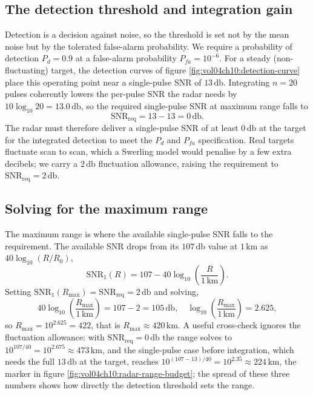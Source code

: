 \subsection{The detection threshold and integration gain}

Detection is a decision against noise, so the threshold is set not by the
mean noise but by the tolerated false-alarm probability. We require a
probability of detection $P_{d} = 0.9$ at a false-alarm probability
$P_{fa} = 10^{-6}$. For a steady (non-fluctuating) target, the detection
curves of figure \ref{fig:vol04ch10:detection-curve} place this operating
point near a single-pulse SNR of $13\,\si{\decibel}$. Integrating
$n = 20$ pulses coherently lowers the per-pulse SNR the radar needs by
$10\log_{10} 20 = 13.0\,\si{\decibel}$, so the required single-pulse SNR
at maximum range falls to
\[
\text{SNR}_{\mathrm{req}} = 13 - 13 = 0\,\si{\decibel}.
\]
The radar must therefore deliver a single-pulse SNR of at least
$0\,\si{\decibel}$ at the target for the integrated detection to meet the
$P_{d}$ and $P_{fa}$ specification. Real targets fluctuate scan to scan,
which a Swerling model would penalise by a few extra decibels; we carry a
$2\,\si{\decibel}$ fluctuation allowance, raising the requirement to
$\text{SNR}_{\mathrm{req}} = 2\,\si{\decibel}$.

\subsection{Solving for the maximum range}

The maximum range is where the available single-pulse SNR falls to the
requirement. The available SNR drops from its $107\,\si{\decibel}$ value
at $1\,\si{\kilo\meter}$ as $40\log_{10}(R/R_{0})$,
\[
\text{SNR}_{1}(R) = 107 - 40\log_{10}\!\left(\frac{R}{1\,\si{\kilo
\meter}}\right).
\]
Setting $\text{SNR}_{1}(R_{\max}) = \text{SNR}_{\mathrm{req}} = 2\,\si{
\decibel}$ and solving,
\[
40\log_{10}\!\left(\frac{R_{\max}}{1\,\si{\kilo\meter}}\right) = 107 - 2
= 105\,\si{\decibel}, \quad \log_{10}\!\left(\frac{R_{\max}}{1\,\si{
\kilo\meter}}\right) = 2.625,
\]
so $R_{\max} = 10^{2.625} = 422$, that is $R_{\max}\approx 420\,\si{\kilo
\meter}$. A useful cross-check ignores the fluctuation allowance: with
$\text{SNR}_{\mathrm{req}} = 0\,\si{\decibel}$ the range solves to
$10^{107/40} = 10^{2.675} \approx 473\,\si{\kilo\meter}$, and the
single-pulse case before integration, which needs the full
$13\,\si{\decibel}$ at the target, reaches $10^{(107-13)/40} = 10^{2.35}
\approx 224\,\si{\kilo\meter}$, the marker in figure
\ref{fig:vol04ch10:radar-range-budget}; the spread of these three numbers
shows how directly the detection threshold sets the range.

